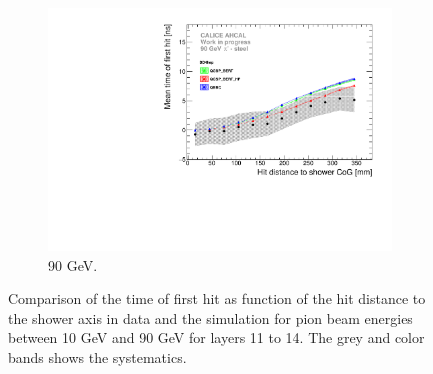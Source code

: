 \begin{figure}[htbp!]
\begin{subfigure}[t]{0.5\textwidth}
    \includegraphics[width=1\textwidth]{../Thesis_Plots/Timing/Pions/Plots/ComparisonToSim/Time_Radius_90GeV_BL_DD4hep.pdf}
    \caption{90 GeV.} \label{fig:Radius_BL_SimData_90GeV_DD4hep}
  \end{subfigure}
  \caption{Comparison of the time of first hit as function of the hit distance to the shower axis in data and the \ddhep simulation for pion beam energies between 10 GeV and 90 GeV for layers 11 to 14. The grey and color bands shows the systematics.}
  \label{fig:Radius_BL_SimData_Comparison_DD4hep}
\end{figure}



